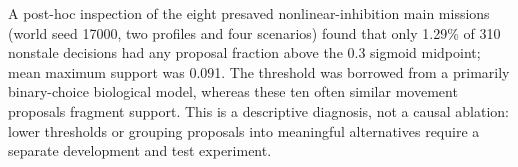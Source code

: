 A post-hoc inspection of the eight presaved nonlinear-inhibition main missions (world seed 17000, two profiles and four scenarios) found that only 1.29\% of 310 nonstale decisions had any proposal fraction above the 0.3 sigmoid midpoint; mean maximum support was 0.091. The threshold was borrowed from a primarily binary-choice biological model, whereas these ten often similar movement proposals fragment support. This is a descriptive diagnosis, not a causal ablation: lower thresholds or grouping proposals into meaningful alternatives require a separate development and test experiment.
